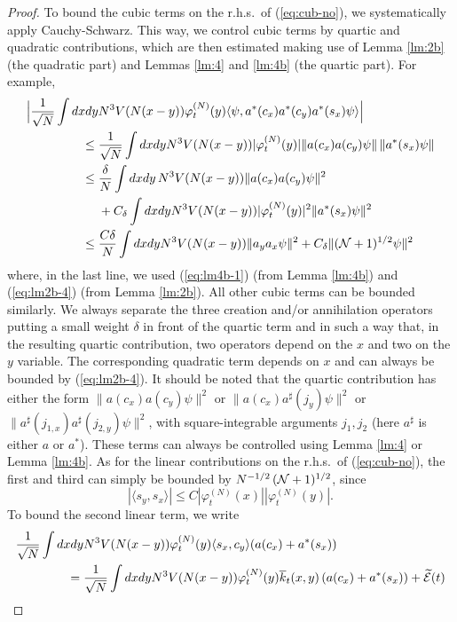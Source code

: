 \documentclass[11pt,a4paper]{article}
\newcommand{\wt}{\widetilde}
\newcommand{\cE}{{\cal E}}
\newcommand{\cN}{{\cal N}}
\begin{document}
\begin{proof}
To bound the cubic terms on the r.h.s.\ of (\ref{eq:cub-no}), we systematically apply Cauchy-Schwarz.
This way, we control cubic terms by quartic and quadratic contributions, which are then estimated making use of Lemma \ref{lm:2b} (the quadratic part) and Lemmas \ref{lm:4} and \ref{lm:4b} (the quartic part). For example,
\[ \begin{split} \Big| \frac{1}{\sqrt{N}}\int dx dy &N^3 V(N(x-y)) \varphi_t^{(N)} (y) \langle  \psi , a^* (c_x) a^* (c_y) a^* (s_x) \psi \rangle \Big| \\ \leq \; &  \frac{1}{\sqrt{N}} \int dx dy N^3 V (N (x-y)) |\varphi_t^{(N)} (y)|  \| a (c_x) a (c_y) \psi \| \, \| a^* (s_x) \psi \| \\ \leq \; & \frac{\delta}{N}  \int dx dy \, N^3 V (N (x-y)) \| a (c_x) a(c_y) \psi \|^2 \\ &+ C_\delta\int dx dy N^3 V (N (x-y)) |\varphi_t^{(N)} (y)|^2 \| a^* (s_x)  \psi \|^2 \\ \leq \; & \frac{C \delta}{N} \int dx dy N^3 V(N (x-y)) \| a_y a_x \psi \|^2 + C_\delta  \| (\cN + 1)^{1/2}  \psi \|^2  \end{split} \]
where, in the last line, we used (\ref{eq:lm4b-1}) (from Lemma \ref{lm:4b}) and (\ref{eq:lm2b-4}) (from Lemma \ref{lm:2b}). All other cubic terms can be bounded similarly. We always separate the three creation and/or annihilation operators putting a small weight $\delta$ in front of the quartic term and
in such a way that, in the resulting quartic contribution, two operators depend on the $x$ and two on the $y$ variable. The corresponding quadratic term depends on $x$ and can always be bounded by (\ref{eq:lm2b-4}). It should be noted that the quartic contribution has either the form $\| a (c_x) a (c_y) \psi \|^2$ or $\| a (c_x) a^\sharp (j_y) \psi \|^2$ or $\| a^\sharp (j_{1,x}) a^\sharp (j_{2,y}) \psi \|^2$, with square-integrable arguments $j_1, j_2$ (here $a^\sharp$ is either $a$ or $a^*$). These terms can always be controlled using Lemma \ref{lm:4} or Lemma \ref{lm:4b}. As for the linear contributions on the r.h.s.\ of (\ref{eq:cub-no}), the first and third can simply be bounded by $N^{-1/2} \, (\cN+1)^{1/2}$, since 
\[ |\langle s_y , s_x \rangle| \leq C |\varphi^{(N)}_t (x)| |\varphi^{(N)}_t (y)|. \]
To bound the second linear term, we write 
\[ \begin{split} 
\frac{1}{\sqrt{N}} \int dx dy & N^3 V(N (x-y)) \varphi_t^{(N)} (y) \langle s_x, c_y \rangle (a(c_x) + a^* (s_x))  \\ = \; & \frac{1}{\sqrt{N}} \int dx dy  N^3 V(N (x-y)) \varphi_t^{(N)} (y) \overline{k}_t (x,y) \, (a(c_x) + a^* (s_x)) + \wt{\cE} (t) \end{split} \]

\end{proof}
\end{document}
